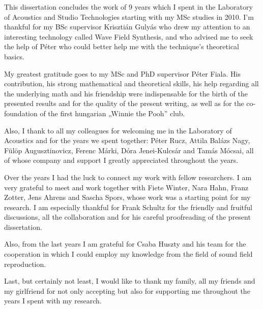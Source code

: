 This dissertation concludes the work of 9 years which I spent in the Laboratory of Acoustics and Studio Technologies starting with my MSc studies in 2010.
I'm thankful for my BSc supervisor Krisztián Gulyás who drew my attention to an interesting technology called Wave Field Synthesis, and who advised me to seek the help of Péter who could better help me with the technique's theoretical basics.

My greatest gratitude goes to my MSc and PhD supervisor Péter Fiala.
His contribution, his strong mathematical and theoretical skills, his help regarding all the underlying math and his friendship were indispensable for the birth of the presented results and for the quality of the present writing, as well as for the co-foundation of the first hungarian „Winnie the Pooh” club.

Also, I thank to all my colleagues for welcoming me in the Laboratory of Acoustics and for the years we spent together: Péter Rucz, Attila Balázs Nagy, Fülöp Augusztinovicz, Ferenc Márki, Dóra Jenei-Kulcsár and Tamás Mócsai, all of whose company and support I greatly appreciated throughout the years.

Over the years I had the luck to connect my work with fellow researchers.
I am very grateful to meet and work together with Fiete Winter, Nara Hahn, Franz Zotter, Jens Ahrens and Sascha Spors, whose work was a starting point for my research.
I am especially thankful for Frank Schultz for the friendly and fruitful discussions, all the collaboration and for his careful proofreading of the present dissertation.

Also, from the last years I am grateful for Csaba Huszty and his team for the cooperation in which I could employ my knowledge from the field of sound field reproduction.

Last, but certainly not least, I would like to thank my family, all my friends and my girlfriend for not only accepting but also for supporting me throughout the years I spent with my research.